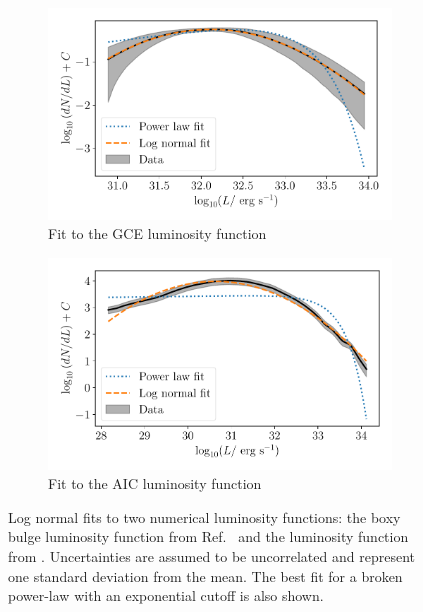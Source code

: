 \documentclass[letter,11pt]{article}
\begin{document}
\begin{figure}
    \centering
    \begin{subfigure}[b]{0.49\textwidth}
        \centering
        \includegraphics[width=\textwidth]{figs/fit-to-gce.pdf}
        \caption{Fit to the GCE luminosity function}
        \label{fig:fit-to-gce-lf}
    \end{subfigure}
    \hfill
    \centering
    \begin{subfigure}[b]{0.49\textwidth}
        \centering
        \includegraphics[width=\textwidth]{figs/fit-to-aic.pdf}
        \caption{Fit to the AIC luminosity function}
        \label{fig:fit-to-aic-lf}
    \end{subfigure}
    \caption{Log normal fits to two numerical luminosity functions: the boxy bulge luminosity function from Ref.~\cite{Ploeg:2020jeh} and the luminosity function from \cite{Gautam:2021wqn}. Uncertainties are assumed to be uncorrelated and represent one standard deviation from the mean. The best fit for a broken power-law with an exponential cutoff is also shown.}
\end{figure}
\end{document}
